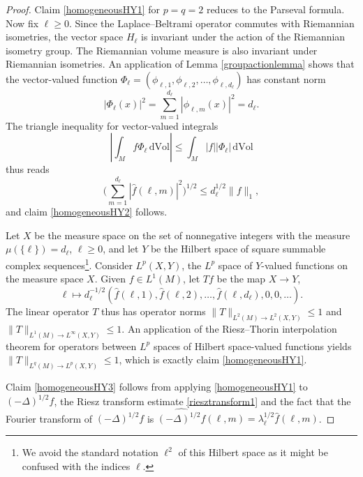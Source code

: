 \documentclass[11pt,a4paper]{article}
\theoremstyle{definition}
\begin{document}
\begin{proof} Claim \eqref{homogeneousHY1} for $p=q=2$ reduces to the Parseval formula. Now fix $\ell \ge 0$. Since the Laplace--Beltrami operator commutes with Riemannian isometries, the vector space $H_{\ell}$ is invariant under the action of the Riemannian isometry group. The Riemannian volume measure is also invariant under Riemannian isometries. An application of Lemma \ref{groupactionlemma} shows that the vector-valued function $\Phi_{\ell}=(\phi_{\ell,1}, \phi_{\ell,2}, \ldots, \phi_{\ell, d_{\ell}})$ has constant norm
\begin{equation}\label{additionformula}
|\Phi_{\ell}(x)|^2 = \sum_{m=1}^{d_{\ell}} |\phi_{\ell,m}(x)|^2 = d_{\ell} .
\end{equation}
The triangle inequality for vector-valued integrals
\[ \left| \int_M f \Phi_{\ell} \, \mathrm{d}\mathrm{Vol} \right| \le \int_M |f| |\Phi_{\ell}| \, \mathrm{d} \mathrm{Vol} \]
thus reads
\[ \Bigg( \sum_{m=1}^{d_{\ell}} |\widehat{f}(\ell,m)|^2 \Bigg)^{1/2} \le d_{\ell}^{1/2} \| f \|_1, \]
and claim \eqref{homogeneousHY2} follows.

Let $X$ be the measure space on the set of nonnegative integers with the measure $\mu(\{ \ell \})=d_{\ell}$, $\ell \ge 0$, and let $Y$ be the Hilbert space of square summable complex sequences\footnote{We avoid the standard notation $\ell^2$ of this Hilbert space as it might be confused with the indices $\ell$.}. Consider $L^p (X,Y)$, the $L^p$ space of $Y$-valued functions on the measure space $X$. Given $f \in L^1 (M)$, let $Tf$ be the map $X \to Y$,
\[ \ell \mapsto d_{\ell}^{-1/2} (\widehat{f}(\ell,1), \widehat{f}(\ell,2), \ldots, \widehat{f}(\ell,d_{\ell}), 0, 0, \ldots). \]
The linear operator $T$ thus has operator norms $\| T \|_{L^2(M) \to L^2 (X,Y)} \le 1$ and $\| T \|_{L^1 (M) \to L^{\infty}(X,Y)} \le 1$. An application of the Riesz--Thorin interpolation theorem for operators between $L^p$ spaces of Hilbert space-valued functions \cite[p.\ 83]{HNVW} yields $\| T \|_{L^q(M) \to L^p(X,Y)} \le 1$, which is exactly claim \eqref{homogeneousHY1}.

Claim \eqref{homogeneousHY3} follows from applying \eqref{homogeneousHY1} to $(-\Delta)^{1/2} f$, the Riesz transform estimate \eqref{riesztransform1} and the fact that the Fourier transform of $(-\Delta)^{1/2}f$ is $\widehat{(-\Delta)^{1/2}f}(\ell, m) = \lambda_{\ell}^{1/2} \widehat{f}(\ell,m)$.


\end{proof}
\end{document}
